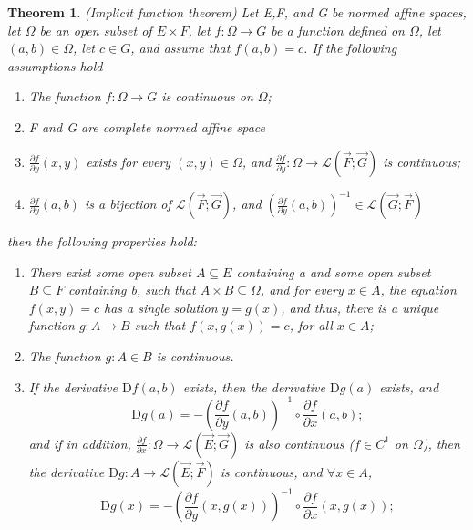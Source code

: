 \documentclass[a4paper]{report}
\newtheorem{theorem}{Theorem}[section]
\begin{document}
\begin{theorem}
    (Implicit function theorem\cite{gallier2019algebra}) Let E,F, and G be normed affine spaces, let $\Omega$ be an open subset of $E\times F$, let $f:\Omega\to G$ be a function defined on $\Omega$, let $(a,b)\in \Omega$, let $c\in G$, and assume that $f(a,b)=c$. If the following assumptions hold
    \begin{enumerate}[label={(\arabic*)}]
        \item The function $f:\Omega\to G$ is continuous on $\Omega$;
        \item F and G are complete normed affine space
        \item $\frac{\partial f}{\partial y}(x,y)$ exists for every $(x,y)\in \Omega$, and $\frac{\partial f}{\partial y}:\Omega\to\mathcal L (\vec F;\vec G)$ is continuous;
        \item $\frac{\partial f}{\partial y}(a,b)$ is a bijection of $\mathcal L (\vec F;\vec G)$, and $\left(\frac{\partial f}{\partial y}(a,b)\right)^{-1} \in \mathcal L (\vec G;\vec F)$
    \end{enumerate}
    then the following properties hold:
    \begin{enumerate}[label={(\alph*)}]
        \item There exist some open subset $A\subseteq E$ containing a and some open subset $B\subseteq F$ containing b, such that $A\times B\subseteq \Omega$, and for every $x\in A$, the equation $f(x,y)=c$ has a single solution $y=g(x)$, and thus, there is a unique function $g:A\to B$ such that $f(x,g(x))=c$, for all $x\in A$;
        \item The function $g:A\in B$ is continuous.
        \item If the derivative $\mathrm D f(a,b)$ exists, then the derivative $\mathrm D g(a)$ exists, and 
            \[
                \mathrm D g(a)=-\left( \frac{\partial f}{\partial y} (a,b)\right)^{-1} \circ \frac{\partial f}{\partial x} (a,b);
            \]
            and if in addition, $\frac{\partial f}{\partial x}:\Omega\to\mathcal L (\vec E;\vec G)$ is also continuous ($f\in C^1$ on $\Omega$), then the derivative $\mathrm D g:A\to \mathcal L (\vec E; \vec F)$ is continuous, and $\forall x\in A$, 
            \[
                \mathrm D g(x)=-\left( \frac{\partial f}{\partial y} (x,g(x))\right)^{-1} \circ \frac{\partial f}{\partial x} (x,g(x));
            \]

    \end{enumerate}
\end{theorem}
\end{document}
